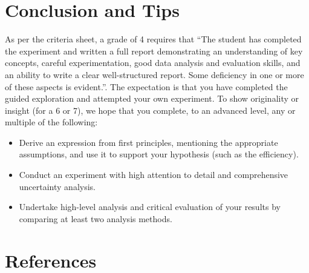 \documentclass[
  letterpaper,
  DIV=11,
  numbers=noendperiod]{scrreprt}
\begin{document}

\hypertarget{conclusion-and-tips}{%
\chapter{Conclusion and Tips}\label{conclusion-and-tips}}

As per the criteria sheet, a grade of 4 requires that ``The student has
completed the experiment and written a full report demonstrating an
understanding of key concepts, careful experimentation, good data
analysis and evaluation skills, and an ability to write a clear
well-structured report. Some deficiency in one or more of these aspects
is evident.''. The expectation is that you have completed the guided
exploration and attempted your own experiment. To show originality or
insight (for a 6 or 7), we hope that you complete, to an advanced level,
any or multiple of the following:

\begin{itemize}
\item
  Derive an expression from first principles, mentioning the appropriate
  assumptions, and use it to support your hypothesis (such as the
  efficiency).
\item
  Conduct an experiment with high attention to detail and comprehensive
  uncertainty analysis.
\item
  Undertake high-level analysis and critical evaluation of your results
  by comparing at least two analysis methods.
\end{itemize}


\hypertarget{references}{%
\chapter*{References}\label{references}}

\end{document}
